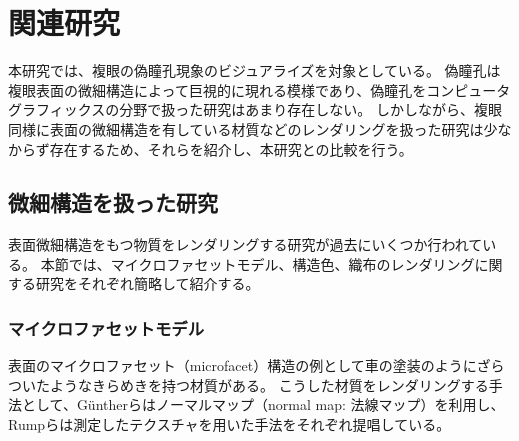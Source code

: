 \chapter{関連研究}
\label{CRelatedWork}

本研究では、複眼の偽瞳孔現象のビジュアライズを対象としている。
偽瞳孔は複眼表面の微細構造によって巨視的に現れる模様であり、偽瞳孔をコンピュータグラフィックスの分野で扱った研究はあまり存在しない。
しかしながら、複眼同様に表面の微細構造を有している材質などのレンダリングを扱った研究は少なからず存在するため、それらを紹介し、本研究との比較を行う。

\section{微細構造を扱った研究}
\label{SMicrostructure}

表面微細構造をもつ物質をレンダリングする研究が過去にいくつか行われている。
本節では、マイクロファセットモデル、構造色、織布のレンダリングに関する研究をそれぞれ簡略して紹介する。

\subsection{マイクロファセットモデル}

表面のマイクロファセット（microfacet）構造の例として車の塗装のようにざらついたようなきらめきを持つ材質がある。
こうした材質をレンダリングする手法として、G\"{u}ntherら\cite{guenther05efficientacquisition}はノーマルマップ（normal map: 法線マップ）を利用し、Rumpら\cite{rump-2008-photo-realistic}は測定したテクスチャを用いた手法をそれぞれ提唱している。

